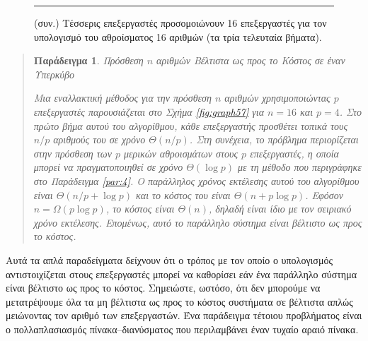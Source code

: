 \documentclass[12pt,a4paper]{article}
\newtheorem{paradeigma}{Παράδειγμα}
\begin{document}
\begin{figure}[H]
\noindent\rule{\textwidth}{0.2pt}
\caption{(συν.) Τέσσερις επεξεργαστές προσομοιώνουν 16 επεξεργαστές για τον 
υπολογισμό του αθροίσματος 16 αριθμών (τα τρία τελευταία βήματα).}
\label{fig:graph56-cont}
\end{figure}
\vspace{0.3cm}

\begin{quote}
\begin{paradeigma} \label{par:8} Πρόσθεση $n$ αριθμών Βέλτιστα ως προς το 
Κόστος σε έναν Υπερκύβο

Μια εναλλακτική μέθοδος για την πρόσθεση $n$ αριθμών χρησιμοποιώντας $p$ 
επεξεργαστές παρουσιάζεται στο Σχήμα \ref{fig:graph57} για $n=16$ και 
$p=4$. Στο πρώτο βήμα αυτού του αλγορίθμου, κάθε επεξεργαστής προσθέτει 
τοπικά τους $n/p$ αριθμούς του σε χρόνο $\Theta(n/p)$. Στη συνέχεια, το 
πρόβλημα περιορίζεται στην πρόσθεση των $p$ μερικών αθροισμάτων στους $p$ 
επεξεργαστές, η οποία μπορεί να πραγματοποιηθεί σε χρόνο $\Theta(\log p)$ 
με τη μέθοδο που περιγράφηκε στο Παράδειγμα \ref{par:4}. Ο παράλληλος 
χρόνος εκτέλεσης αυτού του αλγορίθμου είναι $\Theta(n/p+\log p)$ και το 
κόστος του είναι $\Theta(n+p\log p)$. Εφόσον $n=\Omega(p\log p)$, το κόστος 
είναι $\Theta(n)$, δηλαδή είναι ίδιο με τον σειριακό χρόνο εκτέλεσης. 
Επομένως, αυτό το παράλληλο σύστημα είναι βέλτιστο ως προς το κόστος.
\end{paradeigma}
\end{quote}

Αυτά τα απλά παραδείγματα δείχνουν ότι ο τρόπος με τον οποίο ο υπολογισμός 
αντιστοιχίζεται στους επεξεργαστές μπορεί να καθορίσει εάν ένα παράλληλο 
σύστημα είναι βέλτιστο ως προς το κόστος. Σημειώστε, ωστόσο, ότι δεν 
μπορούμε να μετατρέψουμε όλα τα μη βέλτιστα ως προς το κόστος συστήματα σε 
βέλτιστα απλώς μειώνοντας τον αριθμό των επεξεργαστών. Ένα παράδειγμα 
τέτοιου προβλήματος είναι ο πολλαπλασιασμός πίνακα–διανύσματος που 
περιλαμβάνει έναν τυχαίο αραιό πίνακα. 
\end{document}
